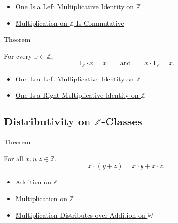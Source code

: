 \begin{dependencies}
\begin{itemize}
  \item \hyperref[thm:one-left-multiplicative-identity-on-z]{One Is a Left Multiplicative Identity on $\mathbb{Z}$}
  \item \hyperref[thm:multiplication-on-z-commutative]{Multiplication on $\mathbb{Z}$ Is Commutative}
\end{itemize}
\end{dependencies}

\begin{theorembox}{Theorem}
\begin{theorem}
\label{thm:one-multiplicative-identity-on-z}
For every $x\in\mathbb{Z}$,
\[
1_{\mathbb{Z}}\cdot x=x
\qquad\text{and}\qquad
x\cdot 1_{\mathbb{Z}}=x.
\]
\end{theorem}
\end{theorembox}

\begin{dependencies}
\begin{itemize}
  \item \hyperref[thm:one-left-multiplicative-identity-on-z]{One Is a Left Multiplicative Identity on $\mathbb{Z}$}
  \item \hyperref[cor:one-right-multiplicative-identity-on-z]{One Is a Right Multiplicative Identity on $\mathbb{Z}$}
\end{itemize}
\end{dependencies}

\subsection*{\texorpdfstring{Distributivity on $\mathbb{Z}$-Classes}{Distributivity on Z-Classes}}

\begin{theorembox}{Theorem}
\begin{theorem}
\label{thm:left-distributivity-on-z}
For all $x,y,z\in\mathbb{Z}$,
\[
x\cdot(y+z)=x\cdot y+x\cdot z.
\]
\end{theorem}
\end{theorembox}

\begin{dependencies}
\begin{itemize}
  \item \hyperref[def:addition-on-z-classes]{Addition on $\mathbb{Z}$}
  \item \hyperref[def:multiplication-on-z-classes]{Multiplication on $\mathbb{Z}$}
  \item \hyperref[thm:multiplication-distributes-over-addition-on-w]{Multiplication Distributes over Addition on $\mathbb{W}$}
\end{itemize}
\end{dependencies}

